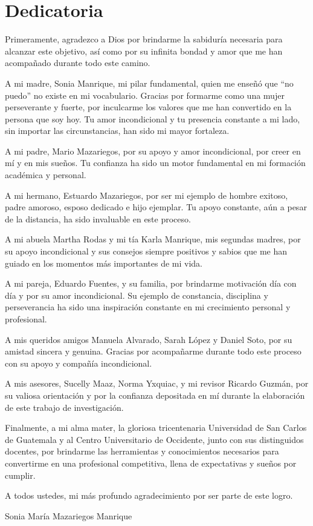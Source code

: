 \chapter*{Dedicatoria}
Primeramente, agradezco a Dios por brindarme la sabiduría necesaria para
alcanzar este objetivo, así como por su infinita bondad y amor que me han
acompañado durante todo este camino.

A mi madre, Sonia Manrique, mi pilar fundamental, quien me enseñó que ``no
puedo'' no existe en mi vocabulario. Gracias por formarme como una mujer
perseverante y fuerte, por inculcarme los valores que me han convertido en la 
persona que soy hoy. Tu amor incondicional y tu presencia constante a mi lado, 
sin importar las circunstancias, han sido mi mayor fortaleza.

A mi padre, Mario Mazariegos, por su apoyo y amor incondicional, por creer en 
mí y en mis sueños. Tu confianza ha sido un motor fundamental en mi formación 
académica y personal.

A mi hermano, Estuardo Mazariegos, por ser mi ejemplo de hombre exitoso, padre 
amoroso, esposo dedicado e hijo ejemplar. Tu apoyo constante, aún a pesar de 
la distancia, ha sido invaluable en este proceso.

A mi abuela Martha Rodas y mi tía Karla Manrique, mis segundas madres, por su 
apoyo incondicional y sus consejos siempre positivos y sabios que me han 
guiado en los momentos más importantes de mi vida.

A mi pareja, Eduardo Fuentes, y su familia, por brindarme motivación día con 
día y por su amor incondicional. Su ejemplo de constancia, disciplina y 
perseverancia ha sido una inspiración constante en mi crecimiento personal y 
profesional.

A mis queridos amigos Manuela Alvarado, Sarah López y Daniel Soto, por su 
amistad sincera y genuina. Gracias por acompañarme durante todo este proceso 
con su apoyo y compañía incondicional.

A mis asesores, Sucelly Maaz, Norma Yxquiac, y mi revisor Ricardo Guzmán, por su
valiosa orientación y por la confianza depositada en mí durante la elaboración
de este trabajo de investigación.

Finalmente, a mi alma mater, la gloriosa tricentenaria Universidad de San 
Carlos de Guatemala y al Centro Universitario de Occidente, junto con sus 
distinguidos docentes, por brindarme las herramientas y conocimientos 
necesarios para convertirme en una profesional competitiva, llena de 
expectativas y sueños por cumplir.

A todos ustedes, mi más profundo agradecimiento por ser parte de este logro.

\vspace{1cm}

\begin{flushright}
Sonia María Mazariegos Manrique
\end{flushright}
